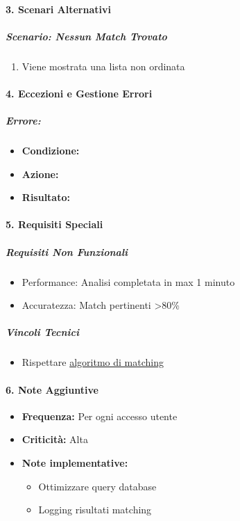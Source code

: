 \paragraph{3. Scenari Alternativi}
\subparagraph*{Scenario: Nessun Match Trovato}
\begin{enumerate}
    \item Viene mostrata una lista non ordinata
\end{enumerate}

\paragraph{4. Eccezioni e Gestione Errori}
\subparagraph*{Errore:}
\begin{itemize}
    \item \textbf{Condizione:}
    \item \textbf{Azione:}
    \item \textbf{Risultato:}
\end{itemize}

\paragraph{5. Requisiti Speciali}
\subparagraph*{Requisiti Non Funzionali}
\begin{itemize}
    \item Performance: Analisi completata in max 1 minuto
    \item Accuratezza: Match pertinenti >80\%
\end{itemize}

\subparagraph*{Vincoli Tecnici}
\begin{itemize}
    \item Rispettare \href{https://www.notion.so/Algoritmo-di-Matching-Richieste-Offerte-Volontariato-1691d07a11eb803cb189e5c7ff60d5a0?pvs=21}{algoritmo di matching}
\end{itemize}

\paragraph{6. Note Aggiuntive}
\begin{itemize}
    \item \textbf{Frequenza:} Per ogni accesso utente
    \item \textbf{Criticità:} Alta
    \item \textbf{Note implementative:}
    \begin{itemize}
        \item Ottimizzare query database
        \item Logging risultati matching
    \end{itemize}
\end{itemize}